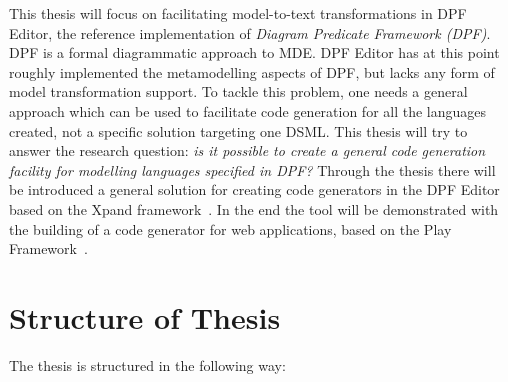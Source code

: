 This thesis will focus on facilitating model-to-text transformations in DPF Editor, the reference implementation of \emph{Diagram Predicate Framework (DPF)}. DPF is a formal diagrammatic approach to MDE. DPF Editor has at this point roughly implemented the metamodelling aspects of DPF, but lacks any form of model transformation support. To tackle this problem, one needs a general approach which can be used to facilitate code generation for all the languages created, not a specific solution targeting one DSML. This thesis will try to answer the research question: \emph{is it possible to create a general code generation facility for modelling languages specified in DPF?} Through the thesis there will be introduced a general solution for creating code generators in the DPF Editor based on the Xpand framework~\cite{xpand}. In the end the tool will be demonstrated with the building of a code generator for web applications, based on the Play Framework~\cite{playframework}.


% 


\section{Structure of Thesis}
The thesis is structured in the following way:

